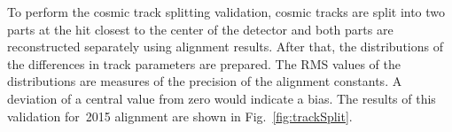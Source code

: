 To perform the cosmic track splitting validation, cosmic tracks are split into two parts at the hit closest to the center of the detector and both parts are reconstructed separately using alignment results. After that, the distributions of the differences in track parameters are prepared. The RMS values of the distributions are measures of the precision of the alignment constants. A deviation of a central value from zero would indicate a bias. The results of this validation for~2015 alignment are shown in Fig.~\ref{fig:trackSplit}.

